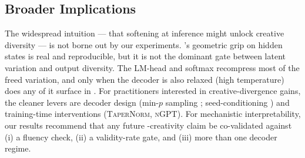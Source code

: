 \subsection{Broader Implications}

The widespread intuition --- that softening \layernorm at inference might
unlock creative diversity --- is not borne out by our experiments.
\layernorm's geometric grip on hidden states is real and reproducible, but
it is not the dominant gate between latent variation and output diversity.
The LM-head and softmax recompress most of the freed variation, and only
when the decoder is also relaxed (\eg high temperature) does any of it
surface in \dat. For practitioners interested in creative-divergence
gains, the cleaner levers are decoder design (min-$p$ sampling
\citep{nguyen2025minp}; seed-conditioning \citep{nagarajan2025roll}) and
training-time interventions (\textsc{TaperNorm}, \textsc{nGPT}). For
mechanistic interpretability, our results recommend that any future
\layernorm-creativity claim be co-validated against (i) a fluency check,
(ii) a validity-rate gate, and (iii) more than one decoder regime.
